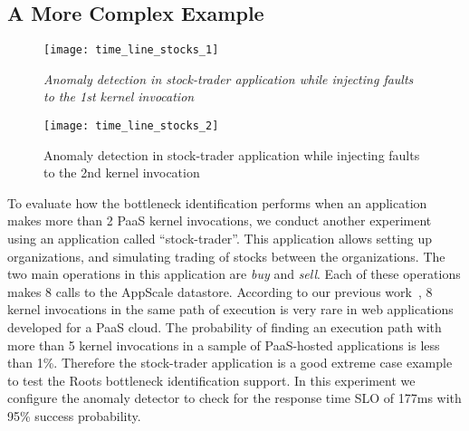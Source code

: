 
\subsection{A More Complex Example}

\begin{figure}
\centering
\texttt{[image: time\_line\_stocks\_1]}
\vspace{-0.2in}
\caption{\textit{Anomaly detection in stock-trader application while injecting faults to the 1st kernel invocation 
}}
\vspace{-0.1in}
\label{fig:time_line_stocks_1}
\end{figure}

\begin{figure}
\centering
\texttt{[image: time\_line\_stocks\_2]}
\vspace{-0.2in}
\caption{Anomaly detection in stock-trader application while injecting faults to the 2nd kernel invocation}
\vspace{-0.1in}
\label{fig:time_line_stocks_2}
\end{figure}

To evaluate how the bottleneck identification performs when an application makes more than 2
PaaS kernel invocations, we conduct another experiment using an application
called ``stock-trader''.
This application allows setting up organizations, and simulating trading of stocks between the
organizations. The two main operations in this application are \textit{buy} and \textit{sell}. Each of
these operations makes 8 calls to the AppScale datastore. 
According to our previous work~\cite{Jayathilaka:2015:RTS:2806777.2806842}, 8 kernel invocations in the
same path of execution is very rare in web applications developed for a PaaS cloud. The probability
of finding an execution path with more than 5 kernel invocations in a sample of PaaS-hosted
applications is less than 1\%. Therefore the stock-trader application is a good extreme case
example to test the Roots bottleneck identification support.
In this experiment we configure the anomaly
detector to check for the response time SLO of 177ms with 95\% success probability.

